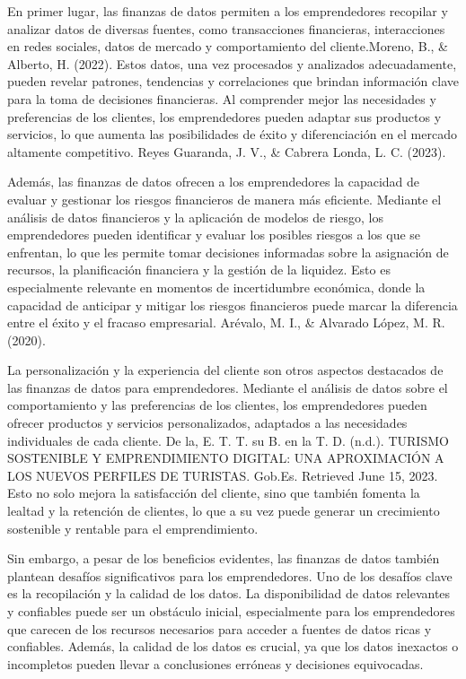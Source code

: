 \documentclass[
  letterpaper,
  DIV=11,
  numbers=noendperiod]{scrreprt}
\begin{document}
En primer lugar, las finanzas de datos permiten a los emprendedores
recopilar y analizar datos de diversas fuentes, como transacciones
financieras, interacciones en redes sociales, datos de mercado y
comportamiento del cliente.Moreno, B., \& Alberto, H. (2022). Estos
datos, una vez procesados y analizados adecuadamente, pueden revelar
patrones, tendencias y correlaciones que brindan información clave para
la toma de decisiones financieras. Al comprender mejor las necesidades y
preferencias de los clientes, los emprendedores pueden adaptar sus
productos y servicios, lo que aumenta las posibilidades de éxito y
diferenciación en el mercado altamente competitivo. Reyes Guaranda, J.
V., \& Cabrera Londa, L. C. (2023).

Además, las finanzas de datos ofrecen a los emprendedores la capacidad
de evaluar y gestionar los riesgos financieros de manera más eficiente.
Mediante el análisis de datos financieros y la aplicación de modelos de
riesgo, los emprendedores pueden identificar y evaluar los posibles
riesgos a los que se enfrentan, lo que les permite tomar decisiones
informadas sobre la asignación de recursos, la planificación financiera
y la gestión de la liquidez. Esto es especialmente relevante en momentos
de incertidumbre económica, donde la capacidad de anticipar y mitigar
los riesgos financieros puede marcar la diferencia entre el éxito y el
fracaso empresarial. Arévalo, M. I., \& Alvarado López, M. R. (2020).

La personalización y la experiencia del cliente son otros aspectos
destacados de las finanzas de datos para emprendedores. Mediante el
análisis de datos sobre el comportamiento y las preferencias de los
clientes, los emprendedores pueden ofrecer productos y servicios
personalizados, adaptados a las necesidades individuales de cada
cliente. De la, E. T. T. su B. en la T. D. (n.d.). TURISMO SOSTENIBLE Y
EMPRENDIMIENTO DIGITAL: UNA APROXIMACIÓN A LOS NUEVOS PERFILES DE
TURISTAS. Gob.Es. Retrieved June 15, 2023. Esto no solo mejora la
satisfacción del cliente, sino que también fomenta la lealtad y la
retención de clientes, lo que a su vez puede generar un crecimiento
sostenible y rentable para el emprendimiento.

Sin embargo, a pesar de los beneficios evidentes, las finanzas de datos
también plantean desafíos significativos para los emprendedores. Uno de
los desafíos clave es la recopilación y la calidad de los datos. La
disponibilidad de datos relevantes y confiables puede ser un obstáculo
inicial, especialmente para los emprendedores que carecen de los
recursos necesarios para acceder a fuentes de datos ricas y confiables.
Además, la calidad de los datos es crucial, ya que los datos inexactos o
incompletos pueden llevar a conclusiones erróneas y decisiones
equivocadas.
\end{document}
